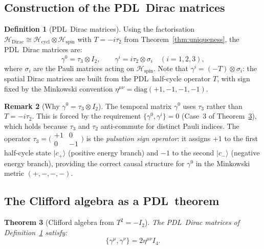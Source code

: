 \documentclass[11pt,a4paper]{article}
\newtheorem{theorem}{Theorem}[section]
\theoremstyle{definition}
\newtheorem{definition}[theorem]{Definition}
\newtheorem{remark}[theorem]{Remark}
\newcommand{\PDL}{\textnormal{PDL}}
\newcommand{\Hcycl}{\mathcal{H}_{\mathrm{cycl}}}
\newcommand{\Hspin}{\mathcal{H}_{\mathrm{spin}}}
\newcommand{\HDirac}{\mathcal{H}_{\mathrm{Dirac}}}
\newcommand{\cplu}{|c_+\rangle}
\newcommand{\cmin}{|c_-\rangle}
\begin{document}
\subsection{Construction of the \PDL\ Dirac matrices}

\begin{definition}[\PDL\ Dirac matrices]
\label{def:gamma}
Using the factorisation $\HDirac \cong \Hcycl \otimes \Hspin$ with $T = -i\tau_2$ from Theorem~\ref{thm:uniqueness}, the \PDL\ Dirac matrices are:
\begin{equation}
\gamma^0 = \tau_3 \otimes I_2, \qquad \gamma^i = i\tau_2 \otimes \sigma_i \quad (i = 1,2,3),
\label{eq:gamma_PDL}
\end{equation}
where $\sigma_i$ are the Pauli matrices acting on $\Hspin$. Note that $\gamma^i = (-T) \otimes \sigma_i$: the spatial Dirac matrices are built from the \PDL\ half-cycle operator $T$, with sign fixed by the Minkowski convention $\eta^{\mu\nu} = \mathrm{diag}(+1,-1,-1,-1)$.
\end{definition}

\begin{remark}[Why $\gamma^0 = \tau_3 \otimes I_2$]
The temporal matrix $\gamma^0$ uses $\tau_3$ rather than $T = -i\tau_2$. This is forced by the requirement $\{\gamma^0, \gamma^i\} = 0$ (Case~3 of Theorem~\ref{thm:clifford}), which holds because $\tau_3$ and $\tau_2$ anti-commute for distinct Pauli indices. The operator $\tau_3 = \bigl(\begin{smallmatrix}+1&0\\0&-1\end{smallmatrix}\bigr)$ is the \emph{pulsation sign operator}: it assigns $+1$ to the first half-cycle state $\cplu$ (positive energy branch) and $-1$ to the second $\cmin$ (negative energy branch), providing the correct causal structure for $\gamma^0$ in the Minkowski metric $(+,-,-,-)$.
\end{remark}

\subsection{The Clifford algebra as a \PDL\ theorem}

\begin{theorem}[Clifford algebra from $T^2 = -I_2$]
\label{thm:clifford}
The \PDL\ Dirac matrices of Definition~\ref{def:gamma} satisfy:
\begin{equation}
\{\gamma^\mu, \gamma^\nu\} = 2\eta^{\mu\nu} I_4.
\label{eq:clifford}
\end{equation}
\end{theorem}
\end{document}
